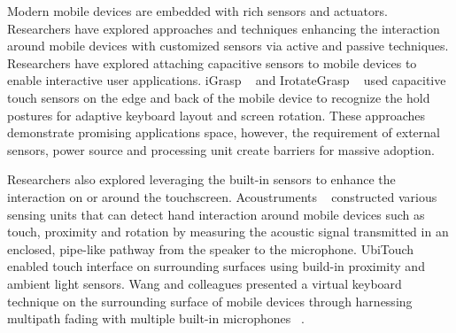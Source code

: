 Modern mobile devices are embedded with rich sensors and actuators. Researchers have explored approaches and techniques enhancing the interaction around mobile devices with customized sensors via active and passive techniques. Researchers have explored attaching capacitive sensors to mobile devices to enable interactive user applications. iGrasp ~\cite{Cheng2013a} and IrotateGrasp ~\cite{Cheng-2013-IrotateGrasp} used capacitive touch sensors on the edge and back of the mobile device to recognize the hold postures for adaptive keyboard layout and screen rotation. These approaches demonstrate promising applications space, however, the requirement of external sensors, power source and processing unit create barriers for massive adoption.

Researchers also explored leveraging the built-in sensors to enhance the interaction on or around the touchscreen. Acoustruments ~\cite{laput2015acoustruments} constructed various sensing units that can detect hand interaction around mobile devices such as touch, proximity and rotation by measuring the acoustic signal transmitted in an enclosed, pipe-like pathway from the speaker to the microphone. UbiTouch ~\cite{wen2016ubitouch} enabled touch interface on surrounding surfaces using build-in proximity and ambient light sensors. Wang and colleagues presented a virtual keyboard technique on the surrounding surface of mobile devices through harnessing multipath fading with multiple built-in microphones ~\cite{wang2014ubiquitous}. 


